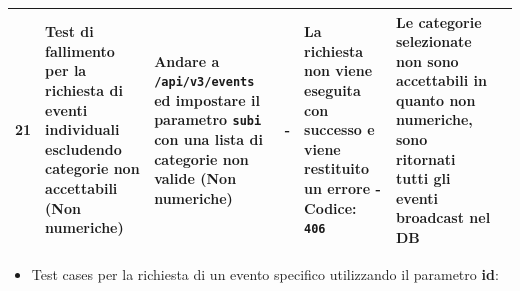 \documentclass{article}
\begin{document}
\begin{table}[htbp]
\begin{tabularx}{\textwidth}{| r | X | X | X | X | X | X |}
        \hline
        21 & Test di fallimento per la richiesta di eventi individuali escludendo categorie non accettabili (Non numeriche) & Andare a \texttt{/api/v3/events} ed impostare il parametro \texttt{subi} con una lista di categorie non valide (Non numeriche) & - & La richiesta non viene eseguita con successo e viene restituito un errore - Codice: \texttt{406} & Le categorie selezionate non sono accettabili in quanto non numeriche, sono ritornati tutti gli eventi broadcast nel DB \\
        \hline
    \end{tabularx}
\end{table}

\clearpage

\begin{itemize}
    \item Test cases per la richiesta di un evento specifico utilizzando il parametro \textbf{id}:
\end{itemize}
\end{document}
